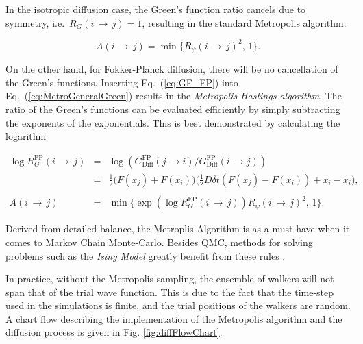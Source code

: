 In the isotropic diffusion case, the Green's function ratio cancels due to symmetry, i.e.~$R_G(i\,\rightarrow\,j) = 1$, resulting in the standard Metropolis algorithm:

\begin{equation}
\label{eq:Metropolis_standard}
 A(i\,\rightarrow\,j) = \min\{R_\psi(i\,\rightarrow\,j)^2, \,1\}.
\end{equation}

On the other hand, for Fokker-Planck diffusion, there will be no cancellation of the Green's functions. Inserting Eq.~(\ref{eq:GF_FP}) into Eq.~(\ref{eq:MetroGeneralGreen}) results in the \textit{Metropolis Hastings algorithm}. The ratio of the Green's functions can be evaluated efficiently by simply subtracting the exponents of the exponentials. This is best demonstrated by calculating the logarithm

\begin{eqnarray}
 \log{R_G^\mathrm{FP}(i\,\rightarrow\,j)} &=& \log \left(G_\mathrm{Diff}^\mathrm{FP}(j\,\rightarrow i)/G_\mathrm{Diff}^\mathrm{FP}(i\,\rightarrow j)\right) \nonumber \\
                                    &=& \frac{1}{2}\big(F(x_j) + F(x_i)\big)\big(\frac{1}{2}D\delta t(F(x_j) - F(x_i)) + x_i - x_i\big), \\
                                    \nonumber\\
 A(i\,\rightarrow\,j) &=& \min\{\exp \left(\log R_G^\mathrm{FP}(i\,\rightarrow\,j)\right)R_\psi(i\,\rightarrow\,j)^2, \,1\}. \label{eq:MetropolisHastings}
\end{eqnarray}

Derived from detailed balance, the Metroplis Algorithm is as a must-have when it comes to Markov Chain Monte-Carlo. Besides QMC, methods for solving problems such as the \textit{Ising Model} greatly benefit from these rules \cite{morten}.

In practice, without the Metropolis sampling, the ensemble of walkers will not span that of the trial wave function. This is due to the fact that the time-step used in the simulations is finite, and the trial positions of the walkers are random. A chart flow describing the implementation of the Metropolis algorithm and the diffusion process is given in Fig. \ref{fig:diffFlowChart}.


